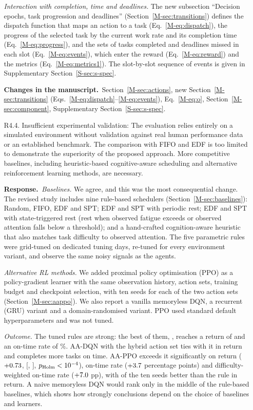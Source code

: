 \documentclass[11pt]{article}
\newcommand{\resp}{\par\smallskip\noindent\textbf{Response.}~}
\newcommand{\change}{\par\smallskip\noindent\textbf{Changes in the manuscript.}~}
\newcommand{\Sec}[1]{Section~\ref{M-#1}}
\newcommand{\Eq}[1]{Eq.~\eqref{M-#1}}
\begin{document}
\emph{Interaction with completion, time and deadlines.} The new subsection ``Decision epochs, task progression and deadlines'' (\Sec{sec:transitions}) defines the dispatch function that maps an action to a task (\Eq{eq:dispatch}), the progress of the selected task by the current work rate and its completion time (\Eq{eq:progress}), and the sets of tasks completed and deadlines missed in each slot (\Eq{eq:events}), which enter the reward (\Eq{eq:reward}) and the metrics (\Eq{eq:metrics1}). The slot-by-slot sequence of events is given in Supplementary Section~\ref{S-sec:s-spec}.
\change \Sec{sec:actions}, new \Sec{sec:transitions} (Eqs.~\eqref{M-eq:dispatch}--\eqref{M-eq:events}), \Eq{eq:o}, \Sec{sec:component}, Supplementary Section~\ref{S-sec:s-spec}.

\begin{rcomment}{R4.4.}
Insufficient experimental validation: The evaluation relies entirely on a simulated environment without validation against real human performance data or an established benchmark. The comparison with FIFO and EDF is too limited to demonstrate the superiority of the proposed approach. More competitive baselines, including heuristic-based cognitive-aware scheduling and alternative reinforcement learning methods, are necessary.
\end{rcomment}
\resp \emph{Baselines.} We agree, and this was the most consequential change. The revised study includes nine rule-based schedulers (\Sec{sec:baselines}): Random, FIFO, EDF and SPT; EDF and SPT with periodic rest; EDF and SPT with state-triggered rest (rest when observed fatigue exceeds or observed attention falls below a threshold); and a hand-crafted cognition-aware heuristic that also matches task difficulty to observed attention. The five parametric rules were grid-tuned on dedicated tuning days, re-tuned for every environment variant, and observe the same noisy signals as the agents.

\emph{Alternative RL methods.} We added proximal policy optimisation (PPO) as a policy-gradient learner with the same observation history, action sets, training budget and checkpoint selection, with ten seeds for each of the two action sets (\Sec{sec:aappo}). We also report a vanilla memoryless DQN, a recurrent (GRU) variant and a domain-randomised variant. PPO used standard default hyperparameters and was not tuned.

\emph{Outcome.} The tuned rules are strong: the best of them, \bestHeur, reaches a return of \bestHeurReturn{} and an on-time rate of \bestHeurOnTimePct\%. AA-DQN with the hybrid action set ties with it in return and completes more tasks on time. AA-PPO exceeds it significantly on return ($+0.73$, [\PpoRetSPTThresholdLo, \PpoRetSPTThresholdHi], $p_{\mathrm{Holm}}<10^{-4}$), on-time rate ($+3.7$ percentage points) and difficulty-weighted on-time rate ($+7.0$ pp), with \seedsPpoRetSPTThreshold{} of the ten seeds better than the rule in return. A naive memoryless DQN would rank only in the middle of the rule-based baselines, which shows how strongly conclusions depend on the choice of baselines and learners.
\end{document}
